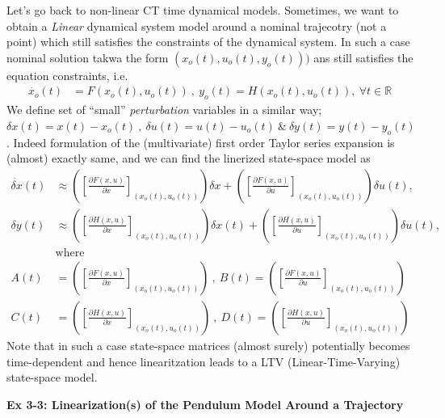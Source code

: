 \documentclass[twoside]{article}
\begin{document}
Let's go back to non-linear CT time dynamical models. Sometimes, 
we want to obtain a \textit{Linear} dynamical system model 
around a nominal trajecotry (not a point) which still satisfies the
constraints of the dynamical system. In such a case nominal solution 
takwa the form $(x_o(t),u_o(t),y_o(t)))$ ans still satisfies the equation constraints, i.e.
%
\begin{align*}
  \dot{x_o}(t) &= F(x_o(t),u_o(t)) \ , \  y_o(t) = H(x_o(t),u_o(t)) , \ \forall
                                        t \in \mathbb{R}
\end{align*}
%
We define set of ``small'' \textit{perturbation} variables in a
similar way; $\delta x(t)
= x(t) - x_o(t) \ , \ \delta u(t) = u(t) - u_o(t) \ \& \ \delta y(t) = y(t)
- y_o(t)$. Indeed formulation of the (multivariate) first order Taylor
series expansion is (almost) exactly same, and we can find the linerized state-space model as
%
\begin{align*}
  \dot{\delta x}(t) &\approx \left( \left[ \frac{\partial F(x,u)}{\partial x}
                      \right]_{(x_o(t),u_o(t))} \right) \delta x + \left( \left[ \frac{\partial F(x,u)}{\partial u}
                      \right]_{(x_o(t),u_o(t))} \right) \delta u(t)  , \\
  \delta y(t)  &\approx \left( \left[ \frac{\partial H(x,u)}{\partial x}
                      \right]_{(x_o(t),u_o(t))} \right) \delta x(t) + \left( \left[ \frac{\partial H(x,u)}{\partial u}
                      \right]_{(x_o(t),u_o(t))} \right) \delta u(t) , 
\\ 
&\mathrm{where}
\\
A(t) &= \left( \left[ \frac{\partial F(x,u)}{\partial x}
                      \right]_{(x_o(t),u_o(t))} \right) \ , \ B(t) = \left( \left[ \frac{\partial F(x,u)}{\partial u}
                      \right]_{(x_o(t),u_o(t))} \right)
\\
C(t) &= \left( \left[ \frac{\partial H(x,u)}{\partial x}
                      \right]_{(x_o(t),u_o(t))} \right) \ , \ D(t) = \left( \left[ \frac{\partial H(x,u)}{\partial u}
                      \right]_{(x_o(t),u_o(t))} \right)
\end{align*}
%
Note that in such a case state-space matrices (almost surely) potentially becomes
time-dependent and hence linearitzation leads to a LTV
(Linear-Time-Varying) state-space model. 

\vspace{12pt}

\textbf{Ex 3-3: Linearization(s) of the Pendulum Model Around a Trajectory}
\end{document}
